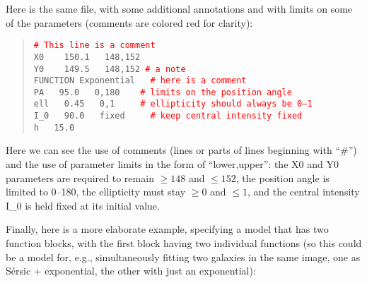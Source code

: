 \documentclass[10pt]{article}
\newcommand{\red}{\textcolor{red}}
\begin{document}
Here is the same file, with some additional annotations and with limits on
some of the parameters (comments are colored red for clarity):

\begin{quote}
  \texttt{\red{\# This line is a comment}}\\
  
  \texttt{X0 ~~   150.1 ~  148,152}\\
  \texttt{Y0 ~~   149.5 ~  148,152         \red{\# a note}}\\
  \texttt{FUNCTION   Exponential  ~ \red{\# here is a comment}}\\
  \texttt{PA  ~  95.0  ~ 0,180   ~~   \red{\# limits on the position angle}}\\
  \texttt{ell  ~  0.45 ~ 0,1     ~~~ \red{\# ellipticity should always be 0--1}}\\
  \texttt{I\_0 ~  90.0 ~  fixed ~~~ \red{\# keep central intensity fixed}}\\
  \texttt{h    ~ 15.0}\\
\end{quote}

Here we can see the use of comments (lines or parts of lines beginning with
``\#'') and the use of parameter limits in the form of ``lower,upper'': the X0
and Y0 parameters are required to remain $\geq 148$ and $\leq 152$, the position
angle is limited to 0--180, the ellipticity must stay $\geq 0$ and $\leq 1$, and
the central intensity I\_0 is held fixed at its initial value.

Finally, here is a more elaborate example, specifying a model that has two
function blocks, with the first block having two individual functions (so this
could be a model for, e.g., simultaneously fitting two galaxies in the same
image, one as S\'ersic + exponential, the other with just an exponential):
\end{document}
